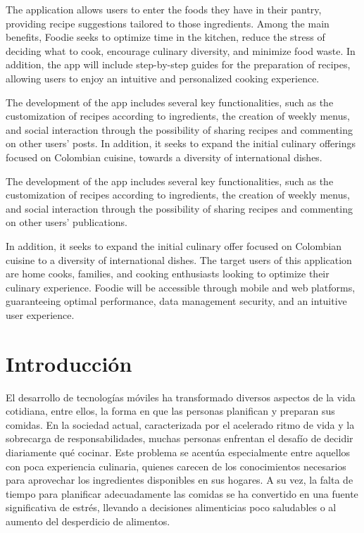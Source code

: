 \documentclass[a4paper,12pt]{article}
\begin{document}
The application allows users to enter the foods they have in their pantry, providing recipe suggestions tailored to those ingredients.
Among the main benefits, Foodie seeks to optimize time in the kitchen, reduce the stress of deciding what to cook, encourage culinary diversity, and minimize food waste. In addition, the app will include step-by-step guides for the preparation of recipes, allowing users to enjoy an intuitive and personalized cooking experience.

The development of the app includes several key functionalities, such as the customization of recipes according to ingredients, the creation of weekly menus, and social interaction through the possibility of sharing recipes and commenting on other users' posts. In addition, it seeks to expand the initial culinary offerings focused on Colombian cuisine, towards a diversity of international dishes.

The development of the app includes several key functionalities, such as the customization of recipes according to ingredients, the creation of weekly menus, and social interaction through the possibility of sharing recipes and commenting on other users' publications.

In addition, it seeks to expand the initial culinary offer focused on Colombian cuisine to a diversity of international dishes. The target users of this application are home cooks, families, and cooking enthusiasts looking to optimize their culinary experience. Foodie will be accessible through mobile and web platforms, guaranteeing optimal performance, data management security, and an intuitive user experience.

\section*{Introducción}
El desarrollo de tecnologías móviles ha transformado diversos aspectos de la vida cotidiana, entre ellos, la forma en que las personas planifican y preparan sus comidas. En la sociedad actual, caracterizada por el acelerado ritmo de vida y la sobrecarga de responsabilidades, muchas personas enfrentan el desafío de decidir diariamente qué cocinar. Este problema se acentúa especialmente entre aquellos con poca experiencia culinaria, quienes carecen de los conocimientos necesarios para aprovechar los ingredientes disponibles en sus hogares. A su vez, la falta de tiempo para planificar adecuadamente las comidas se ha convertido en una fuente significativa de estrés, llevando a decisiones alimenticias poco saludables o al aumento del desperdicio de alimentos.
\end{document}
